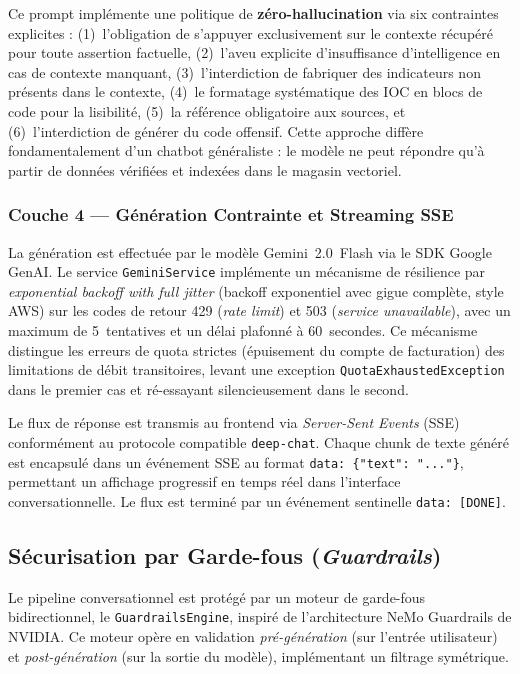 Ce prompt implémente une politique de \textbf{zéro-hallucination} via six contraintes explicites : (1)~l'obligation de s'appuyer exclusivement sur le contexte récupéré pour toute assertion factuelle, (2)~l'aveu explicite d'insuffisance d'intelligence en cas de contexte manquant, (3)~l'interdiction de fabriquer des indicateurs non présents dans le contexte, (4)~le formatage systématique des IOC en blocs de code pour la lisibilité, (5)~la référence obligatoire aux sources, et (6)~l'interdiction de générer du code offensif. Cette approche diffère fondamentalement d'un chatbot généraliste : le modèle ne peut répondre qu'à partir de données vérifiées et indexées dans le magasin vectoriel.

\subsubsection{Couche 4 --- Génération Contrainte et Streaming SSE}

La génération est effectuée par le modèle Gemini~2.0~Flash via le SDK Google GenAI. Le service \texttt{GeminiService} implémente un mécanisme de résilience par \textit{exponential backoff with full jitter} (backoff exponentiel avec gigue complète, style AWS) sur les codes de retour 429 (\textit{rate limit}) et 503 (\textit{service unavailable}), avec un maximum de 5~tentatives et un délai plafonné à 60~secondes. Ce mécanisme distingue les erreurs de quota strictes (épuisement du compte de facturation) des limitations de débit transitoires, levant une exception \texttt{QuotaExhaustedException} dans le premier cas et ré-essayant silencieusement dans le second.

Le flux de réponse est transmis au frontend via \textit{Server-Sent Events} (SSE) conformément au protocole compatible \texttt{deep-chat}. Chaque chunk de texte généré est encapsulé dans un événement SSE au format \texttt{data: \{"text": "..."\}}, permettant un affichage progressif en temps réel dans l'interface conversationnelle. Le flux est terminé par un événement sentinelle \texttt{data: [DONE]}.

\subsection{Sécurisation par Garde-fous (\textit{Guardrails})}

Le pipeline conversationnel est protégé par un moteur de garde-fous bidirectionnel, le \texttt{GuardrailsEngine}, inspiré de l'architecture NeMo Guardrails de NVIDIA. Ce moteur opère en validation \textit{pré-génération} (sur l'entrée utilisateur) et \textit{post-génération} (sur la sortie du modèle), implémentant un filtrage symétrique.


